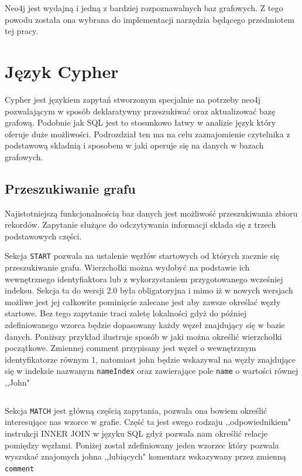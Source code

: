 \documentclass[brudnopis]{xmgr}
\begin{document}
Neo4j jest wydajną i jedną z bardziej rozpoznawalnych baz grafowych. Z tego powodu została ona wybrana do implementacji narzędzia będącego przedmiotem tej pracy.

\section{Język Cypher}
Cypher jest językiem zapytań stworzonym specjalnie na potrzeby neo4j pozwalającym w sposób deklaratywny przeszukiwać oraz aktualizować bazę grafową. Podobnie jak SQL jest to stosunkowo łatwy w analizie język który oferuje duże możliwości. Podrozdział ten ma na celu zaznajomienie czytelnika z podstawową składnią i sposobem w jaki operuje się na danych w bazach grafowych.

\subsection{Przeszukiwanie grafu}

Najistotniejszą funkcjonalnością baz danych jest możliwość przeszukiwania zbioru rekordów. Zapytanie służące do odczytywania informacji składa się z trzech podstawowych części.

Sekcja \texttt{START} pozwala na ustalenie węzłów startowych od których zacznie się przeszukiwanie grafu. Wierzchołki można wydobyć na podstawie ich wewnętrznego identyfiaktora lub z wykorzystaniem przygotowanego wcześniej indeksu. Sekcja ta do wersji 2.0 była obligatoryjna i mimo iż w nowych wersjach możliwe jest jej całkowite pominięcie zalecane jest aby zawsze określać węzły startowe. Bez tego zapytanie traci zaletę lokalności gdyż do później zdefiniowanego wzorca będzie dopasowany każdy węzeł znajdujący się w bazie danych. Poniższy przykład ilustruje sposób w jaki można określić wierzchołki początkowe. Zmiennej comment przypisany jest węzeł o wewnętrznym identyfikatorze równym 1, natomiast john będzie wskazywał na węzły znajdujące się w indeksie nazwanym \texttt{nameIndex} oraz zawierające pole \texttt{name} o wartości równej ,,John"


\inputminted{cypher}{listings/cypher/start-section.cypher}

Sekcja \texttt{MATCH} jest główną częścią zapytania, pozwala ona bowiem określić interesujące nas wzorce w grafie. Część ta jest swego rodzaju ,,odpowiednikiem" instrukcji INNER JOIN w języku SQL gdyż pozwala nam określić relacje pomiędzy węzłami. Poniżej został zdefiniowany jeden wzorzec który pozwala wyszukać znajomych johna ,,lubiących" komentarz wskazywany przez zmienną \texttt{comment}
\end{document}

